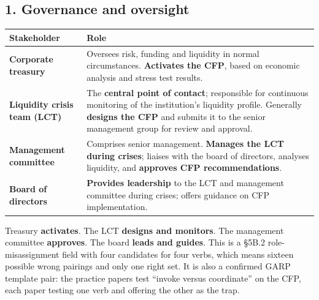 
\subsection{1. Governance and oversight}

\begin{center}
\small
\begin{tabularx}{\textwidth}{@{}p{4.0cm} X@{}}
\toprule
\rowcolor{FRMSoft}\textbf{Stakeholder} & \textbf{Role} \\
\midrule
\textbf{Corporate treasury} & Oversees risk, funding and liquidity in normal circumstances. \textbf{Activates the CFP}, based on economic analysis and stress test results. \\
\addlinespace
\textbf{Liquidity crisis team (LCT)} & The \textbf{central point of contact}; responsible for continuous monitoring of the institution's liquidity profile. Generally \textbf{designs the CFP} and submits it to the senior management group for review and approval. \\
\addlinespace
\textbf{Management committee} & Comprises senior management. \textbf{Manages the LCT during crises}; liaises with the board of directors, analyses liquidity, and \textbf{approves CFP recommendations}. \\
\addlinespace
\textbf{Board of directors} & \textbf{Provides leadership} to the LCT and management committee during crises; offers guidance on CFP implementation. \\
\bottomrule
\end{tabularx}
\end{center}

\begin{lrtrapbox}
Treasury \textbf{activates}. The LCT \textbf{designs and monitors}. The management committee \textbf{approves}. The board \textbf{leads and guides}. This is a \S5B.2 role-misassignment field with four candidates for four verbs, which means sixteen possible wrong pairings and only one right set. It is also a confirmed GARP template pair: the practice papers test ``invoke versus coordinate'' on the CFP, each paper testing one verb and offering the other as the trap.
\end{lrtrapbox}

